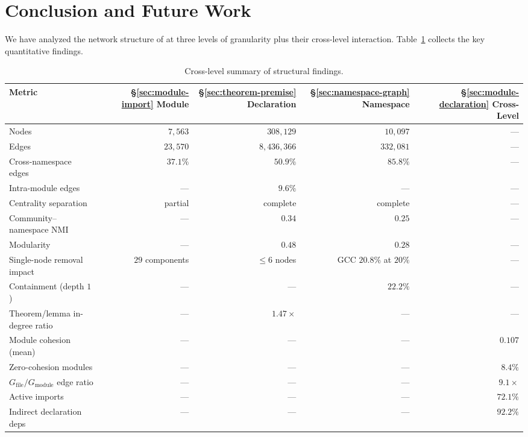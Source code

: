 \section{Conclusion and Future Work}
\label{sec:conclusion}

We have analyzed the network structure of  at three levels of granularity plus their cross-level interaction. Table~\ref{tab:summary} collects the key quantitative findings.

\begin{table}[ht]
\centering
\caption{Cross-level summary of structural findings.}
\label{tab:summary}
\small
\begin{tabular}{lrrrr}
\toprule
Metric & \S\ref{sec:module-import} Module & \S\ref{sec:theorem-premise} Declaration & \S\ref{sec:namespace-graph} Namespace & \S\ref{sec:module-declaration} Cross-Level \\
\midrule
Nodes                      & $7{,}563$        & $308{,}129$      & $10{,}097$       & --- \\
Edges                      & $23{,}570$       & $8{,}436{,}366$  & $332{,}081$      & --- \\
Cross-namespace edges       & $37.1\%$         & $50.9\%$         & $85.8\%$         & --- \\
Intra-module edges          & ---              & $9.6\%$          & ---              & --- \\
Centrality separation       & partial          & complete         & complete         & --- \\
Community--namespace NMI   & ---              & $0.34$           & $0.25$           & --- \\
Modularity                 & ---              & $0.48$           & $0.28$           & --- \\
Single-node removal impact & $29$ components  & $\le 6$ nodes    & GCC $20.8\%$ at $20\%$ & --- \\
Containment (depth $1$)    & ---              & ---              & $22.2\%$         & --- \\
Theorem/lemma in-degree ratio & ---            & $1.47\times$     & ---              & --- \\
Module cohesion (mean)     & ---              & ---              & ---              & $0.107$ \\
Zero-cohesion modules      & ---              & ---              & ---              & $8.4\%$ \\
$G_{\mathrm{file}}/G_{\mathrm{module}}$ edge ratio & ---  & ---  & ---              & $9.1\times$ \\
Active imports             & ---              & ---              & ---              & $72.1\%$ \\
Indirect declaration deps  & ---              & ---              & ---              & $92.2\%$ \\
\bottomrule
\end{tabular}
\end{table}

